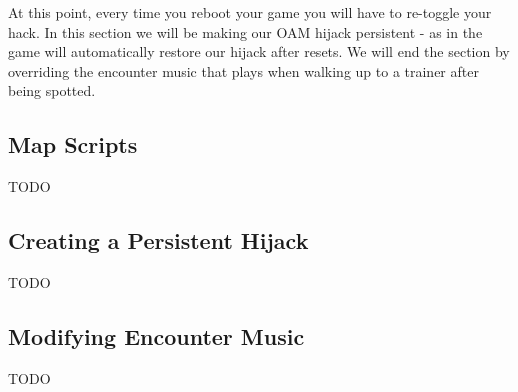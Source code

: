 \documentclass[../main.tex]{subfiles}
\begin{document}
    At this point, every time you reboot your game you will have to re-toggle your hack.  In this section we will be making our OAM hijack persistent - as in the game will automatically restore our hijack after resets.  We will end the section by overriding the encounter music that plays when walking up to a trainer after being spotted.

    \subsection{Map Scripts}
    TODO

    \subsection{Creating a Persistent Hijack}
    TODO

    \subsection{Modifying Encounter Music}
    TODO
\end{document}
